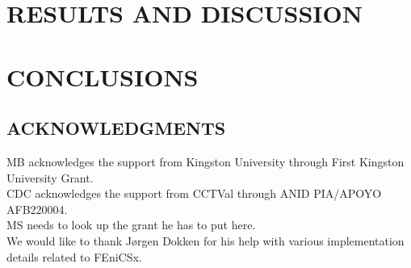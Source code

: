 \documentclass[12pt]{article}
\begin{document}
\section*{\sffamily \Large RESULTS AND DISCUSSION}


 








\section*{\sffamily \Large CONCLUSIONS}




\subsection*{\sffamily \large ACKNOWLEDGMENTS}
MB acknowledges the support from Kingston University through First Kingston University Grant. \\
CDC acknowledges the support from CCTVal through ANID PIA/APOYO AFB220004.\\
MS needs to look up the grant he has to put here. \\
We would like to thank J{\o}rgen Dokken for his help with various implementation details related to FEniCSx.
\end{document}
